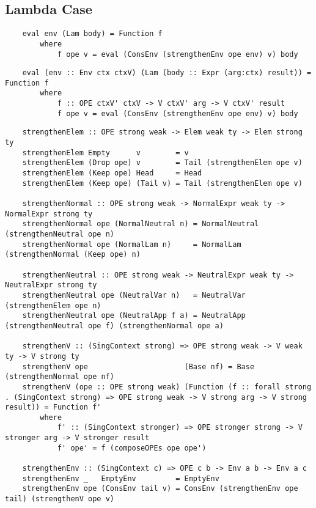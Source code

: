 
\subsection{Lambda Case}

\begin{lstlisting}
    eval env (Lam body) = Function f 
        where
            f ope v = eval (ConsEnv (strengthenEnv ope env) v) body
\end{lstlisting}

\begin{lstlisting}
    eval (env :: Env ctx ctxV) (Lam (body :: Expr (arg:ctx) result)) = Function f 
        where
            f :: OPE ctxV' ctxV -> V ctxV' arg -> V ctxV' result
            f ope v = eval (ConsEnv (strengthenEnv ope env) v) body
\end{lstlisting}



\begin{lstlisting}
    strengthenElem :: OPE strong weak -> Elem weak ty -> Elem strong ty
    strengthenElem Empty      v        = v
    strengthenElem (Drop ope) v        = Tail (strengthenElem ope v)
    strengthenElem (Keep ope) Head     = Head
    strengthenElem (Keep ope) (Tail v) = Tail (strengthenElem ope v)

    strengthenNormal :: OPE strong weak -> NormalExpr weak ty -> NormalExpr strong ty
    strengthenNormal ope (NormalNeutral n) = NormalNeutral (strengthenNeutral ope n)
    strengthenNormal ope (NormalLam n)     = NormalLam (strengthenNormal (Keep ope) n)

    strengthenNeutral :: OPE strong weak -> NeutralExpr weak ty -> NeutralExpr strong ty
    strengthenNeutral ope (NeutralVar n)   = NeutralVar (strengthenElem ope n)
    strengthenNeutral ope (NeutralApp f a) = NeutralApp (strengthenNeutral ope f) (strengthenNormal ope a) 

    strengthenV :: (SingContext strong) => OPE strong weak -> V weak ty -> V strong ty
    strengthenV ope                      (Base nf) = Base (strengthenNormal ope nf)
    strengthenV (ope :: OPE strong weak) (Function (f :: forall strong . (SingContext strong) => OPE strong weak -> V strong arg -> V strong result)) = Function f' 
        where
            f' :: (SingContext stronger) => OPE stronger strong -> V stronger arg -> V stronger result
            f' ope' = f (composeOPEs ope ope')
    
    strengthenEnv :: (SingContext c) => OPE c b -> Env a b -> Env a c
    strengthenEnv _   EmptyEnv         = EmptyEnv
    strengthenEnv ope (ConsEnv tail v) = ConsEnv (strengthenEnv ope tail) (strengthenV ope v)
\end{lstlisting}

